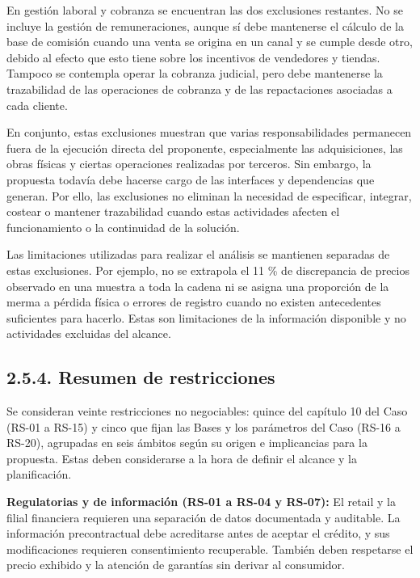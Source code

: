 \documentclass[11pt]{article}
\begin{document}
En gestión laboral y cobranza se encuentran las dos exclusiones restantes. No se incluye la gestión de remuneraciones, aunque sí debe mantenerse el cálculo de la base de comisión cuando una venta se origina en un canal y se cumple desde otro, debido al efecto que esto tiene sobre los incentivos de vendedores y tiendas. Tampoco se contempla operar la cobranza judicial, pero debe mantenerse la trazabilidad de las operaciones de cobranza y de las repactaciones asociadas a cada cliente.

En conjunto, estas exclusiones muestran que varias responsabilidades permanecen fuera de la ejecución directa del proponente, especialmente las adquisiciones, las obras físicas y ciertas operaciones realizadas por terceros. Sin embargo, la propuesta todavía debe hacerse cargo de las interfaces y dependencias que generan. Por ello, las exclusiones no eliminan la necesidad de especificar, integrar, costear o mantener trazabilidad cuando estas actividades afecten el funcionamiento o la continuidad de la solución.

Las limitaciones utilizadas para realizar el análisis se mantienen separadas de estas exclusiones. Por ejemplo, no se extrapola el 11 \% de discrepancia de precios observado en una muestra a toda la cadena ni se asigna una proporción de la merma a pérdida física o errores de registro cuando no existen antecedentes suficientes para hacerlo. Estas son limitaciones de la información disponible y no actividades excluidas del alcance.

\subsection{2.5.4. Resumen de restricciones}\label{resumen-de-restricciones}

Se consideran veinte restricciones no negociables: quince del capítulo 10 del Caso (RS-01 a RS-15) y cinco que fijan las Bases y los parámetros del Caso (RS-16 a RS-20), agrupadas en seis ámbitos según su origen e implicancias para la propuesta. Estas deben considerarse a la hora de definir el alcance y la planificación.

\textbf{Regulatorias y de información (RS-01 a RS-04 y RS-07):} El retail y la filial financiera requieren una separación de datos documentada y auditable. La información precontractual debe acreditarse antes de aceptar el crédito, y sus modificaciones requieren consentimiento recuperable. También deben respetarse el precio exhibido y la atención de garantías sin derivar al consumidor.
\end{document}
